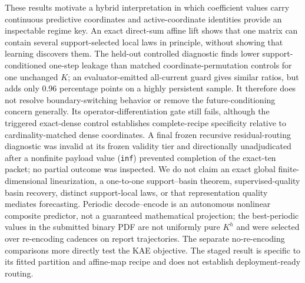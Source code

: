 \documentclass[11pt]{article}
\begin{document}
These results motivate a hybrid interpretation in which coefficient values carry continuous predictive coordinates and active-coordinate identities provide an inspectable regime key. An exact direct-sum affine lift shows that one matrix can contain several support-selected local laws in principle, without showing that learning discovers them. The held-out controlled diagnostic finds lower support-conditioned one-step leakage than matched coordinate-permutation controls for one unchanged \(K\); an evaluator-emitted all-current guard gives similar ratios, but adds only 0.96 percentage points on a highly persistent sample. It therefore does not resolve boundary-switching behavior or remove the future-conditioning concern generally. Its operator-differentiation gate still fails, although the triggered exact-dense control establishes complete-recipe specificity relative to cardinality-matched dense coordinates. A final frozen recursive residual-routing diagnostic was invalid at its frozen validity tier and directionally unadjudicated after a nonfinite payload value (\texttt{inf}) prevented completion of the exact-ten packet; no partial outcome was inspected. We do not claim an exact global finite-dimensional linearization, a one-to-one support--basin theorem, supervised-quality basin recovery, distinct support-local laws, or that representation quality mediates forecasting. Periodic decode--encode is an autonomous nonlinear composite predictor, not a guaranteed mathematical projection; the best-periodic values in the submitted binary PDF are not uniformly pure \(K^h\) and were selected over re-encoding cadences on report trajectories. The separate no-re-encoding comparisons more directly test the KAE objective. The staged result is specific to its fitted partition and affine-map recipe and does not establish deployment-ready routing.
\end{document}

